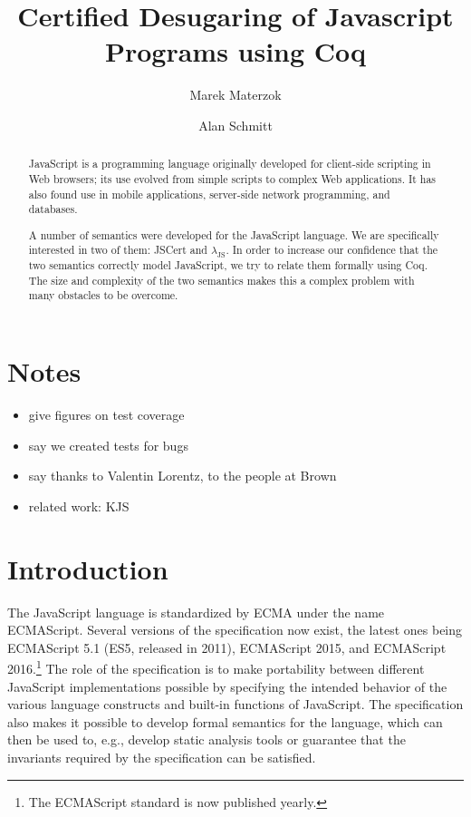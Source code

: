 \documentclass{llncs}
\begin{document}
\title{Certified Desugaring of Javascript Programs using Coq}

\author{Marek Materzok \and Alan Schmitt}

\maketitle

\newcommand{\lambdajs}{$\lambda_\textrm{JS}$\xspace}

\begin{abstract}
JavaScript is a programming language originally developed for client-side
scripting in Web browsers; its use evolved from simple scripts to
complex Web applications. It has also found use in mobile applications,
server-side network programming, and databases.

A number of semantics were developed for the JavaScript language.
We are specifically interested in two of them: JSCert and \lambdajs.
In order to increase our confidence that the two semantics correctly
model JavaScript, we try to relate them formally using Coq. The size and complexity
of the two semantics makes this a complex problem with many obstacles
to be overcome.
\end{abstract}

\section{Notes}

\begin{itemize}
\item give figures on test coverage
\item say we created tests for bugs
\item say thanks to Valentin Lorentz, to the people at Brown
\item related work: KJS
\end{itemize}

\section{Introduction}

The JavaScript language is standardized by ECMA under the name ECMAScript.
Several versions of the specification now exist, the latest ones being
ECMAScript 5.1 (ES5, released in 2011), ECMAScript 2015, and ECMAScript
2016.\footnote{The ECMAScript standard is now published yearly.} The role of the
specification is to make portability between different JavaScript
implementations possible by specifying the intended behavior of the various
language constructs and built-in functions of JavaScript. The specification also
makes it possible to develop formal semantics for the language, which can then
be used to, e.g., develop static analysis tools or guarantee that the invariants
required by the specification can be satisfied.
\end{document}
